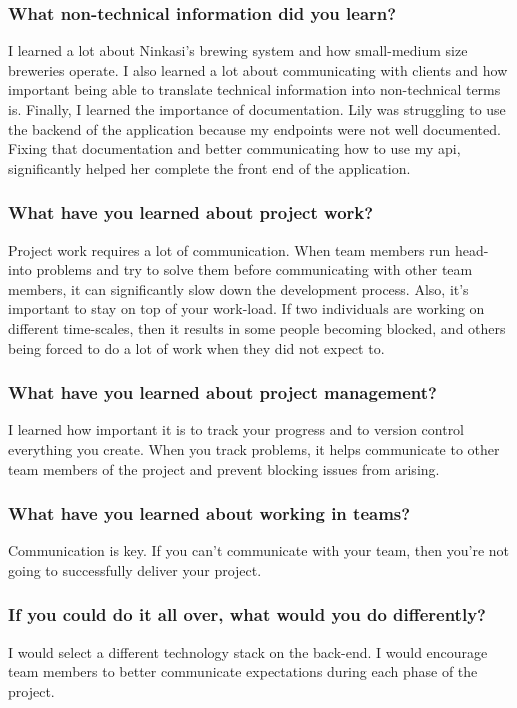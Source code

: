 \documentclass[draftclsnofoot,onecolumn,letterpaper,10pt]{IEEEtran}
\begin{document}
		\subsubsection{What non-technical information did you learn?}
		I learned a lot about Ninkasi's brewing system and how small-medium size breweries operate.
		I also learned a lot about communicating with clients and how important being able to translate technical information into non-technical terms is.
		Finally, I learned the importance of documentation.
		Lily was struggling to use the backend of the application because my endpoints were not well documented.
		Fixing that documentation and better communicating how to use my api, significantly helped her complete the front end of the application.

		\subsubsection{What have you learned about project work?}
		Project work requires a lot of communication.
		When team members run head-into problems and try to solve them before communicating with other team members, it can significantly slow down the development process.
		Also, it's important to stay on top of your work-load.
		If two individuals are working on different time-scales, then it results in some people becoming blocked, and others being forced to do a lot of work when they did not expect to.

		\subsubsection{What have you learned about project management?}
		I learned how important it is to track your progress and to version control everything you create.
		When you track problems, it helps communicate to other team members of the project and prevent blocking issues from arising.

		\subsubsection{What have you learned about working in teams?}
		Communication is key.
		If you can't communicate with your team, then you're not going to successfully deliver your project.

		\subsubsection{If you could do it all over, what would you do differently?}
		I would select a different technology stack on the back-end.
		I would encourage team members to better communicate expectations during each phase of the project.
\end{document}
